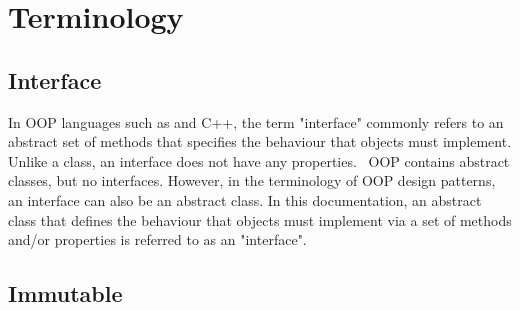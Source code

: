 \section{Terminology}
\subsection{Interface} \label{sec:interface}
In OOP languages such as \java and C++, the term "interface" commonly refers to an abstract set of methods that specifies the behaviour that objects must implement. Unlike a class, an interface does not have any properties. \matlab\ OOP contains abstract classes, but no interfaces. However, in the terminology of OOP design patterns, an interface can also be an abstract class. In this documentation, an abstract class that defines the behaviour that objects must implement via a set of methods and/or properties is referred to as an "interface".
\subsection{Immutable}
